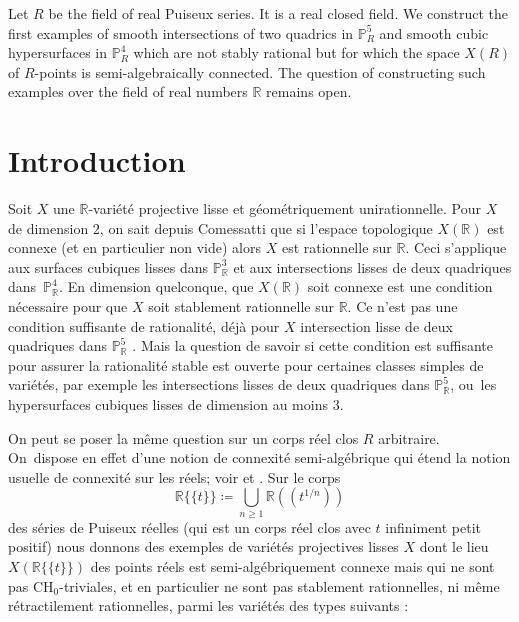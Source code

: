 \documentclass[JEP,XML,SOM,Unicode,francais,published]{cedram}
\newcommand{\CH}{\mathrm{CH}}
\theoremstyle{definition}
\newcommand{\R}{\mathbb R}
\renewcommand{\P}{\mathbb P}
\newcommand{\puiseux}{\mathbb{R}\{\!\{t\}\!\}}
\begin{document}
\begin{altabstract}
Let $R$ be the field of real Puiseux series. It is a real closed field. We construct the first examples of smooth intersections of two quadrics in $\mathbb{P}_R^5$ and smooth cubic hypersurfaces in $\mathbb{P}_R^4$ which are not stably rational but for which the space $X(R)$ of $R$-points is semi-algebraically connected. The question of constructing such examples over the field of real numbers $\mathbb{R}$ remains open.
\end{altabstract}

\maketitle
\vspace*{-\baselineskip}
\tableofcontents
\mainmatter
\vspace*{-2\baselineskip}\vskip0pt

\section*{Introduction}

Soit $X$ une $\R$-variété projective lisse et géométriquement unirationnelle.
Pour $X$ de dimension $2$, on sait depuis Comessatti \cite{comessatti1912fondamenti} que si l'espace topologique $X(\R)$ est connexe (et en particulier non vide) alors $X$ est rationnelle sur $\R$. Ceci s'applique aux surfaces cubiques lisses dans $\P^3_{\R} $ et aux intersections lisses
de deux quadriques dans~$\P^4_{\R}$.
En dimension quelconque, que $X(\R)$ soit connexe
est une condition nécessaire pour que $X$ soit stablement rationnelle sur $\R$.
Ce n'est pas une condition suffisante de rationalité, déjà pour $X$
intersection lisse de deux quadriques dans $\P^5_\R$
\cite{hassett2021rationality}.
Mais la question de savoir si cette condition est suffisante pour assurer la rationalité stable est ouverte pour
certaines classes simples de variétés, par exemple les intersections lisses de deux quadriques dans $\P^5_\R$, ou~les hypersurfaces cubiques lisses de dimension au moins $3$.

On peut se poser la même question sur un corps réel clos $R$ arbitraire. On~dispose en effet d'une notion de connexité semi-algébrique qui étend la notion usuelle de connexité sur les réels; voir \cite{delfs1981semialgebraicI} et \cite[Def.\,2.4.2]{bochnak1998real}. Sur le corps \[\puiseux\coloneqq \bigcup_{n\geq1} \R(\!(t^{1/n})\!)\]
des séries de Puiseux réelles (qui est un corps réel clos avec $t$ infiniment petit positif) nous donnons des exemples
de variétés projectives lisses $X$ dont le lieu $X(\puiseux)$ des points réels est
semi-algébriquement connexe mais qui ne sont pas
$\CH_{0}$-triviales, et en particulier ne sont pas stablement rationnelles,
ni même rétractilement rationnelles, parmi les variétés des types suivants :
\end{document}
